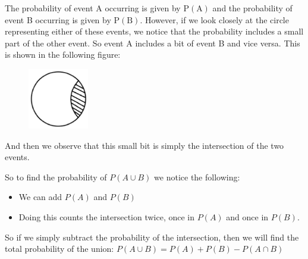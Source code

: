 \par \label{m39377*eip-227}The probability of event A occurring is given by $\mathrm{P\left(A\right)}$ and the probability of event B occurring is given by \begin{math}\mathrm{P\left(B\right)}\end{math}. However, if we look closely at the circle representing either of these events, we notice that the probability includes a small part of the other event. So event A includes a bit of event B and vice versa. This is shown in the following figure:
    \setcounter{subfigure}{0}
	\begin{figure}[H] %
    \begin{center}
    \label{m39377*id1112!!!underscore!!!media}\label{m39377*id1112!!!underscore!!!printimage}\includegraphics[width=100px]{col11306.imgs/m39377_identity1.png} %
      \vspace{2pt}
    \vspace{.1in}
    \end{center}
 \end{figure}       
And then we observe that this small bit is simply the intersection of the two events.\par \label{m39377*eip-609}So to find the probability of $P\left(A\cup B\right)$ we notice the following: \label{m39377*id9324}\begin{itemize}[noitemsep]
            \item We can add  $P\left(A\right)$ and  \begin{math}P\left(B\right)\end{math}\item Doing this counts the intersection twice, once in \begin{math}P\left(A\right)\end{math} and once in \begin{math}P\left(B\right)\end{math}.\end{itemize}
So if we simply subtract the probability of the intersection, then we will find the total probability of the union: 
$P\left(A\cup B\right)=P\left(A\right)+P\left(B\right)-P\left(A\cap B\right)$\par \par
